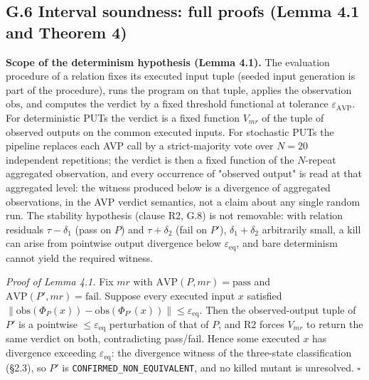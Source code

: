 \documentclass[manuscript,screen,review]{acmart}
\begin{document}
\subsection{G.6 Interval soundness: full proofs (Lemma 4.1 and Theorem 4)}\label{g.6-interval-proofs}

\textbf{Scope of the determinism hypothesis (Lemma 4.1).} The evaluation
procedure of a relation fixes its executed input tuple (seeded input
generation is part of the procedure), runs the program on that tuple,
applies the observation $\mathrm{obs}$, and computes the verdict by a
fixed threshold functional at tolerance $\varepsilon_{\mathrm{AVP}}$.
For deterministic PUTs the verdict is a fixed function $V_{mr}$ of the
tuple of observed outputs on the common executed inputs. For stochastic
PUTs the pipeline replaces each AVP call by a strict-majority vote over
$N=20$ independent repetitions; the verdict is then a fixed function of
the $N$-repeat aggregated observation, and every occurrence of "observed
output" is read at that aggregated level: the witness produced below is
a divergence of aggregated observations, in the AVP verdict semantics,
not a claim about any single random run. The stability hypothesis
(clause R2, G.8) is not removable: with relation residuals
$\tau-\delta_1$ (pass on $P$) and $\tau+\delta_2$ (fail on $P'$),
$\delta_1+\delta_2$ arbitrarily small, a kill can arise from pointwise
output divergence below $\varepsilon_{\mathrm{eq}}$, and bare
determinism cannot yield the required witness.

\emph{Proof of Lemma 4.1.} Fix $mr$ with
$\mathrm{AVP}(P,mr)=\mathrm{pass}$ and
$\mathrm{AVP}(P',mr)=\mathrm{fail}$. Suppose every executed input $x$
satisfied
$\|\mathrm{obs}(\Phi_P(x))-\mathrm{obs}(\Phi_{P'}(x))\|\le\varepsilon_{\mathrm{eq}}$.
Then the observed-output tuple of $P'$ is a pointwise
$\le\varepsilon_{\mathrm{eq}}$ perturbation of that of $P$, and R2
forces $V_{mr}$ to return the same verdict on both, contradicting
pass/fail. Hence some executed $x$ has divergence exceeding
$\varepsilon_{\mathrm{eq}}$: the divergence witness of the three-state
classification (§2.3), so $P'$ is
\texttt{CONFIRMED\_NON\_EQUIVALENT}, and no killed mutant is
unresolved. $\square$
\end{document}

